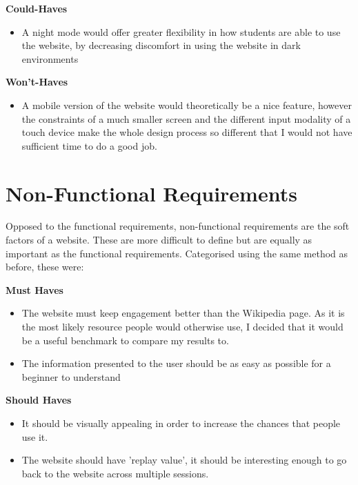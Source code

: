 \documentclass{l4proj}
\begin{document}
\textbf{Could-Haves}

\begin{itemize}
    \item A night mode would offer greater flexibility in how students are able to use the website, by decreasing discomfort in using the website in dark environments
\end{itemize}

\textbf{Won't-Haves}

\begin{itemize}
    \item A mobile version of the website would theoretically be a nice feature, however the constraints of a much smaller screen and the different input modality of a touch device make the whole design process so different that I would not have sufficient time to do a good job.
\end{itemize}



\section{Non-Functional Requirements}

Opposed to the functional requirements, non-functional requirements are the soft factors of a website.  These are more difficult to define but are equally as important as the functional requirements.  Categorised using the same method as before, these were:

\textbf{Must Haves}

\begin{itemize}
    \item The website must keep engagement better than the Wikipedia page.  As it is the most likely resource people would otherwise use, I decided that it would be a useful benchmark to compare my results to.

    \item The information presented to the user should be as easy as possible for a beginner to understand
\end{itemize}

\textbf{Should Haves}

\begin{itemize}
    \item It should be visually appealing in order to increase the chances that people use it.
    \item The website should have 'replay value', it should be interesting enough to go back to the website across multiple sessions.
\end{itemize}
\end{document}
